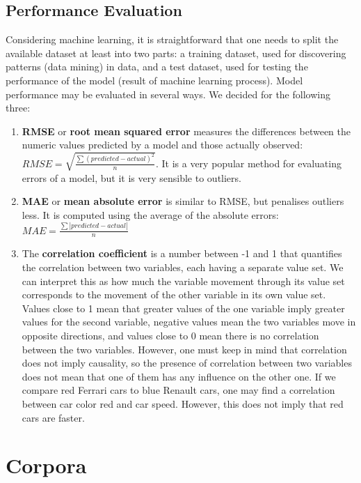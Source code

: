 \documentclass[a4paper]{scrreprt}
\begin{document}
\section{Performance Evaluation}
Considering machine learning, it is straightforward that one needs to split the available dataset at least into two parts: a training dataset, used for discovering patterns (data mining) in data, and a test dataset, used for testing the performance of the model (result of machine learning process). 
Model performance may be evaluated in several ways. We decided for the following three:
\begin{enumerate}
	\item \textbf{RMSE} or \textbf{root mean squared error} measures the differences between the numeric values predicted by a model and those actually observed: 
$RMSE = \sqrt{\frac{\sum(predicted-actual)^2}{n}}$. It is a very popular method for evaluating errors of a model, but it is very sensible to outliers.
	\item \textbf{MAE} or \textbf{mean absolute error} is similar to RMSE, but penalises outliers less. It is computed using the average of the absolute errors: $MAE = \frac{\sum\left|predicted-actual\right|}{n}$
	\item The \textbf{correlation coefficient} is a number between -1 and 1 that quantifies the correlation between two variables, each having a separate value set. We can interpret this as how much the variable movement through its value set corresponds to the movement of the other variable in its own value set. Values close to 1 mean that greater values of the one variable imply greater values for the second variable, negative values mean the two variables move in opposite directions, and values close to 0 mean there is no correlation between the two variables. However, one must keep in mind that correlation does not imply causality, so the presence of correlation between two variables does not mean that one of them has any influence on the other one. If we compare red Ferrari cars to blue Renault cars, one may find a correlation between car color red and car speed. However, this does not imply that red cars are faster.
\end{enumerate}

\chapter{Corpora}
\end{document}
